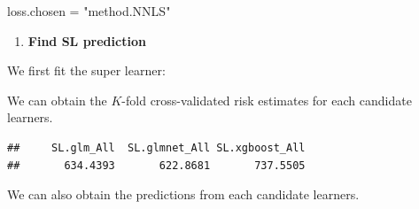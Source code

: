 \documentclass[
]{book}
\newenvironment{Shaded}{\begin{snugshade}}{\end{snugshade}}
\newcommand{\AttributeTok}[1]{\textcolor[rgb]{0.77,0.63,0.00}{#1}}
\newcommand{\FunctionTok}[1]{\textcolor[rgb]{0.00,0.00,0.00}{#1}}
\newcommand{\NormalTok}[1]{#1}
\newcommand{\OtherTok}[1]{\textcolor[rgb]{0.56,0.35,0.01}{#1}}
\newcommand{\SpecialCharTok}[1]{\textcolor[rgb]{0.00,0.00,0.00}{#1}}
\newcommand{\StringTok}[1]{\textcolor[rgb]{0.31,0.60,0.02}{#1}}
\providecommand{\tightlist}{%
  \setlength{\itemsep}{0pt}\setlength{\parskip}{0pt}}
\begin{document}
\begin{Shaded}
\begin{Highlighting}[]
\NormalTok{loss.chosen }\OtherTok{=} \StringTok{"method.NNLS"}
\end{Highlighting}
\end{Shaded}

\begin{enumerate}
\def\labelenumi{\arabic{enumi}.}
\setcounter{enumi}{3}
\tightlist
\item
  \textbf{Find SL prediction}
\end{enumerate}

We first fit the super learner:

\begin{Shaded}
\end{Shaded}

We can obtain the \(K\)-fold cross-validated risk estimates for each candidate learners.

\begin{Shaded}
\end{Shaded}

\begin{verbatim}
##     SL.glm_All  SL.glmnet_All SL.xgboost_All 
##       634.4393       622.8681       737.5505
\end{verbatim}

We can also obtain the predictions from each candidate learners.

\begin{Shaded}
\end{Shaded}
\end{document}
